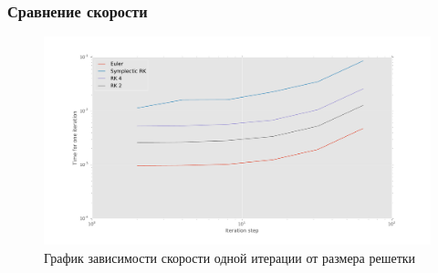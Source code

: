 \documentclass[t]{beamer}
\begin{document}
\begin{frame}
    \frametitle{Сравнение скорости}
    \begin{figure}[h]
        \includegraphics[width=\textwidth]{speedComparsion}
        \caption{График зависимости скорости одной итерации от размера решетки}
    \end{figure}
\end{frame}

\begin{frame}
	\begin{center}
	\end{center}
\end{frame}
\end{document}
